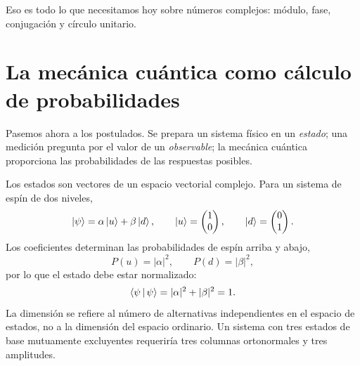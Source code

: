 \begin{classroomqa}
\end{classroomqa}

Eso es todo lo que necesitamos hoy sobre números complejos: módulo, fase, conjugación y círculo unitario.

\section{La mecánica cuántica como cálculo de probabilidades}

Pasemos ahora a los postulados. Se prepara un sistema físico en un \emph{estado}; una medición pregunta por el valor de un \emph{observable}; la mecánica cuántica proporciona las probabilidades de las respuestas posibles.

Los estados son vectores de un espacio vectorial complejo. Para un sistema de espín de dos niveles,
\begin{equation}
  \left\lvert\psi\right\rangle=\alpha\left\lvert u\right\rangle+\beta\left\lvert d\right\rangle,
  \qquad
  \left\lvert u\right\rangle=\begin{pmatrix}1\\0\end{pmatrix},
  \qquad
  \left\lvert d\right\rangle=\begin{pmatrix}0\\1\end{pmatrix}.
  \label{eq:l03-two-level-state}
\end{equation}
Los coeficientes determinan las probabilidades de espín arriba y abajo,
\begin{equation}
  P(u)=|\alpha|^2,
  \qquad
  P(d)=|\beta|^2,
\end{equation}
por lo que el estado debe estar normalizado:
\begin{equation}
  \left\langle\psi\,\middle|\,\psi\right\rangle
  =|\alpha|^2+|\beta|^2
  =1.
  \label{eq:l03-state-normalization}
\end{equation}
La dimensión se refiere al número de alternativas independientes en el espacio de estados, no a la dimensión del espacio ordinario. Un sistema con tres estados de base mutuamente excluyentes requeriría tres columnas ortonormales y tres amplitudes.

